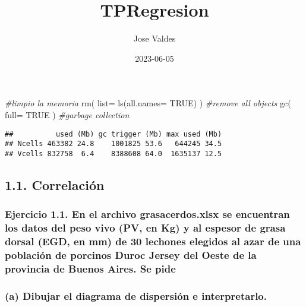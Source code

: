 \documentclass[
]{article}
\title{TPRegresion}
\author{Jose Valdes}
\date{2023-06-05}
\newenvironment{Shaded}{\begin{snugshade}}{\end{snugshade}}
\newcommand{\AttributeTok}[1]{\textcolor[rgb]{0.77,0.63,0.00}{#1}}
\newcommand{\CommentTok}[1]{\textcolor[rgb]{0.56,0.35,0.01}{\textit{#1}}}
\newcommand{\ConstantTok}[1]{\textcolor[rgb]{0.00,0.00,0.00}{#1}}
\newcommand{\FunctionTok}[1]{\textcolor[rgb]{0.00,0.00,0.00}{#1}}
\newcommand{\NormalTok}[1]{#1}
\begin{document}
\maketitle

{
\setcounter{tocdepth}{2}
\tableofcontents
}
\begin{Shaded}
\begin{Highlighting}[]
\CommentTok{\#limpio la memoria}
\FunctionTok{rm}\NormalTok{( }\AttributeTok{list=} \FunctionTok{ls}\NormalTok{(}\AttributeTok{all.names=} \ConstantTok{TRUE}\NormalTok{) )  }\CommentTok{\#remove all objects}
\FunctionTok{gc}\NormalTok{( }\AttributeTok{full=} \ConstantTok{TRUE}\NormalTok{ )                 }\CommentTok{\#garbage collection}
\end{Highlighting}
\end{Shaded}

\begin{verbatim}
##          used (Mb) gc trigger (Mb) max used (Mb)
## Ncells 463382 24.8    1001825 53.6   644245 34.5
## Vcells 832758  6.4    8388608 64.0  1635137 12.5
\end{verbatim}

\hypertarget{correlaciuxf3n}{%
\subsection{\texorpdfstring{{1.1.
Correlación}}{1.1. Correlación}}\label{correlaciuxf3n}}

\hypertarget{ejercicio-1.1.-en-el-archivo-grasacerdos.xlsx-se-encuentran-los-datos-del-peso-vivo-pv-en-kg-y-al-espesor-de-grasa-dorsal-egd-en-mm-de-30-lechones-elegidos-al-azar-de-una-poblaciuxf3n-de-porcinos-duroc-jersey-del-oeste-de-la-provincia-de-buenos-aires.-se-pide}{%
\subsubsection{Ejercicio 1.1. En el archivo grasacerdos.xlsx se
encuentran los datos del peso vivo (PV, en Kg) y al espesor de grasa
dorsal (EGD, en mm) de 30 lechones elegidos al azar de una población de
porcinos Duroc Jersey del Oeste de la provincia de Buenos Aires. Se
pide}\label{ejercicio-1.1.-en-el-archivo-grasacerdos.xlsx-se-encuentran-los-datos-del-peso-vivo-pv-en-kg-y-al-espesor-de-grasa-dorsal-egd-en-mm-de-30-lechones-elegidos-al-azar-de-una-poblaciuxf3n-de-porcinos-duroc-jersey-del-oeste-de-la-provincia-de-buenos-aires.-se-pide}}

\hypertarget{a-dibujar-el-diagrama-de-dispersiuxf3n-e-interpretarlo.}{%
\subsubsection{(a) Dibujar el diagrama de dispersión e
interpretarlo.}\label{a-dibujar-el-diagrama-de-dispersiuxf3n-e-interpretarlo.}}
\end{document}
